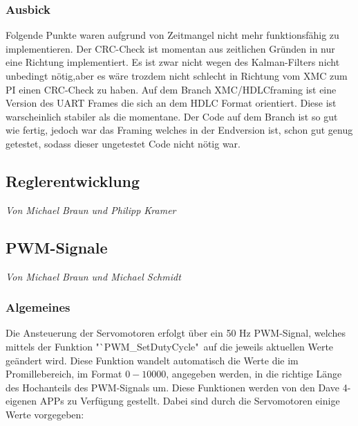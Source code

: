 \documentclass[12pt,a4paper,bibliography=totoc,listof=totoc]{scrartcl}
\begin{document}
\subsubsection{Ausbick}
Folgende Punkte waren aufgrund von Zeitmangel nicht mehr funktionsfähig zu implementieren.
Der CRC-Check ist momentan aus zeitlichen Gründen in nur eine Richtung implementiert. Es ist zwar nicht wegen des Kalman-Filters nicht unbedingt nötig,aber
 es wäre trozdem nicht schlecht in Richtung vom XMC zum PI einen CRC-Check zu haben. 
Auf dem Branch XMC/HDLCframing ist eine Version des UART Frames die sich an dem HDLC Format orientiert. Diese 
ist warscheinlich stabiler als die momentane. Der Code auf dem Branch ist so gut wie fertig, jedoch war das Framing welches 
in der Endversion ist, schon gut genug getestet, sodass dieser ungetestet Code nicht nötig war.
\subsection{Reglerentwicklung}
\textit{Von Michael Braun und Philipp Kramer}\newline

\subsection{PWM-Signale}
\textit{Von Michael Braun und Michael Schmidt}\newline
\subsubsection{ Algemeines}
Die Ansteuerung der Servomotoren erfolgt über ein 50 Hz PWM-Signal, welches mittels der Funktion 
"`PWM\_SetDutyCycle"\, auf die jeweils aktuellen Werte geändert wird. Diese Funktion wandelt automatisch 
die Werte die im Promillebereich, im Format $0-10000$, angegeben werden, in die richtige Länge des 
Hochanteils des PWM-Signals um. Diese Funktionen werden von den Dave 4- eigenen APPs zu Verfügung 
gestellt. Dabei sind durch die Servomotoren einige Werte vorgegeben:
\end{document}
